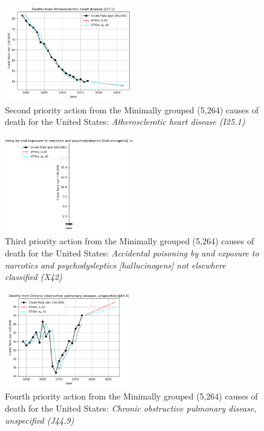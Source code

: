 \documentclass[10pt, a4paper, twocolumn]{IEEEconf}
\begin{document}
\begin{figure}[H]
  \centering
  \includegraphics[width=0.5\textwidth]{results/US_ICD10_MINIMALLY_GROUPED/Atherosclerotic_heart_disease_I25_1_ets.png}
  \caption{Second priority action from the Minimally grouped (5,264) causes of death for the United States: \textit{Atherosclerotic heart disease (I25.1)}}\label{fig:k7b}
\end{figure}

\begin{figure}[H]
  \centering
  \includegraphics[width=0.5\textwidth]{results/US_ICD10_MINIMALLY_GROUPED/Accidental_poisoning_by_and_exposure_to_narcotics_and_psychodysleptics_hallucinogens_not_elsewhere_classified_X42_ets.png}
  \caption{Third priority action from the Minimally grouped (5,264) causes of death for the United States: \textit{Accidental poisoning by and exposure to narcotics and psychodysleptics [hallucinogens] not elsewhere classified (X42)}}\label{fig:k7c}
\end{figure}

\begin{figure}[H]
  \centering
  \includegraphics[width=0.5\textwidth]{results/US_ICD10_MINIMALLY_GROUPED/Chronic_obstructive_pulmonary_disease_unspecified_J44_9_ets.png}
  \caption{Fourth priority action from the Minimally grouped (5,264) causes of death for the United States: \textit{Chronic obstructive pulmonary disease, unspecified (J44.9)}}\label{fig:k7d}
\end{figure}
\end{document}

